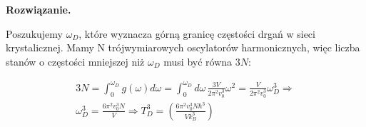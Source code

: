 \documentclass[11pt,a4paper]{article}
\newenvironment{solution}{\vspace{1cm} \par\textbf{Rozwiązanie.} \vspace{1cm}}{}
\begin{document}
\begin{solution}

Poszukujemy $\omega_D$, które wyznacza górną granicę częstości drgań w sieci krystalicznej.
Mamy N trójwymiarowych oscylatorów harmonicznych, więc liczba stanów o częstości mniejszej 
niż $\omega_D$ musi być równa $3N$:

\begin{align*}
  3N = \int_0^{\omega_D} g(\omega) d\omega = 
  \int_0^{\omega_D} d\omega \, \frac{3V}{2\pi^2 v_0^3} \omega^2 =
  \frac{V}{2\pi^2 v_0^3} \omega_D^3 \Rightarrow \\
  \omega_D^3 = \frac{6\pi^2 v_0^3 N}{V} \Rightarrow 
  T_D^3 = \left( \frac{6\pi^2 v_0^3 N \hbar^3}{V k_B^3} \right)
\end{align*}


\newpage
\end{solution}

\end{document}
